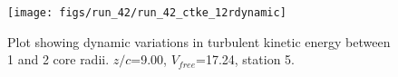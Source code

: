 \begin{figure}[H]
\centering
\texttt{[image: figs/run\_42/run\_42\_ctke\_12rdynamic]}
\caption{Plot showing dynamic variations in turbulent kinetic energy between 1 and 2 core radii. $z/c$=9.00, $V_{free}$=17.24, station 5.}
\label{fig:run_42_ctke_12rdynamic}
\end{figure}


